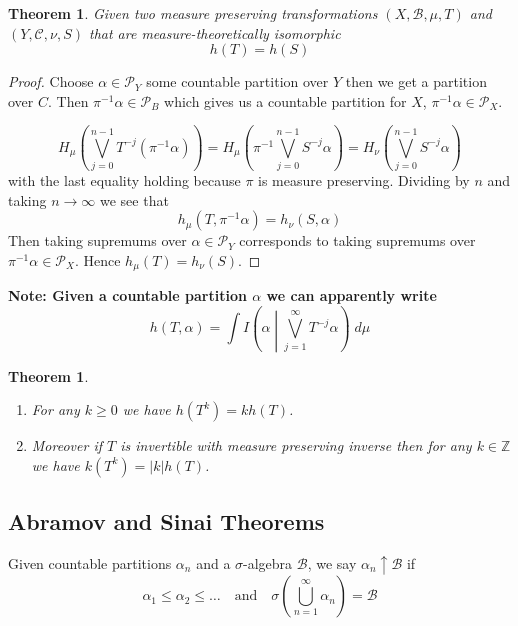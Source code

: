 \documentclass[11pt]{article}
\newcommand{\abs}[1]{\left|#1\right|}
\newcommand{\relmiddle}[1]{\mathrel{}\middle#1\mathrel{}}
\newcommand{\rmv}{\relmiddle|}
\newcommand{\Z}{\mathbb{Z}}
\newcommand{\gvn}[2]{\ensuremath{\left(#1\rmv#2\right)}}
\newcommand{\infog}[2]{\ensuremath{I\gvn{#1}{#2}}}
\newcommand{\dm}{\;d\mu}
\newenvironment{defin}
	{\begin{mdframed}[backgroundcolor=white, roundcorner=5pt, linewidth=1pt, linecolor=RoyalBlue]}
	{\end{mdframed}}
\newenvironment{note}
	{\begin{mdframed}[backgroundcolor=white, linecolor=RubineRed, roundcorner=5pt, linewidth=1pt]\bfseries{Note:}\normalfont}
	{\end{mdframed}}
\newtheorem{theorem}[prop]{Theorem}
\begin{document}
\begin{theorem}
Given two measure preserving transformations $(X, \mathcal{B}, \mu, T)$ and $(Y, \mathcal{C}, \nu, S)$ that are measure-theoretically isomorphic
\[
	h(T) = h(S)
\]
\end{theorem}

\begin{proof}
Choose $\alpha\in\mathcal{P}_Y$ some countable partition over $Y$ then we get a partition over $C$.
Then $\pi^{-1}\alpha\in\mathcal{P}_B$ which gives us a countable partition for $X$, $\pi^{-1}\alpha\in\mathcal{P}_X$.

\[
	H_\mu\left( \bigvee_{j=0}^{n-1} T^{-j}(\pi^{-1}\alpha)\right) = H_\mu\left( \pi^{-1}\bigvee_{j=0}^{n-1} S^{-j}\alpha\right)
	= H_\nu\left(\bigvee_{j=0}^{n-1} S^{-j}\alpha \right)
\]
with the last equality holding because $\pi$ is measure preserving.
Dividing by $n$ and taking $n\to\infty$ we see that
\[
	h_\mu(T, \pi^{-1}\alpha) = h_\nu(S, \alpha)
\]
Then taking supremums over $\alpha\in\mathcal{P}_Y$ corresponds to taking supremums over $\pi^{-1}\alpha \in \mathcal{P}_X$.
Hence $h_\mu(T) = h_\nu(S)$.
\end{proof}

\begin{note}
Given a countable partition $\alpha$ we can apparently write
\[
	h(T, \alpha) = \int \infog{\alpha}{\bigvee_{j=1}^\infty T^{-j}\alpha}\dm
\]
\end{note}

\begin{theorem}
\begin{enumerate}[label=(\roman*)]
	\item For any $k\geq 0$ we have $h(T^k) = kh(T)$.
	\item Moreover if $T$ is invertible with measure preserving inverse then for any $k\in \Z$ we have $k(T^k)=\abs{k}h(T)$.
\end{enumerate}
\end{theorem}

\subsection{Abramov and Sinai Theorems}

\begin{defin}
	Given countable partitions $\alpha_n$ and a $\sigma$-algebra $\mathcal{B}$, we say $\alpha_n\uparrow\mathcal{B}$ if
	\[
		\alpha_1 \leq \alpha_2 \leq \dots \quad \text{and} \quad \sigma\left( \bigcup_{n=1}^\infty \alpha_n\right)=\mathcal{B}
	\]
\end{defin}
\end{document}

